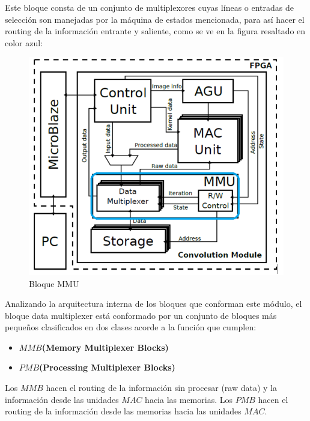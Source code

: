 Este bloque consta de un conjunto de multiplexores cuyas líneas o entradas de selección son manejadas por la máquina de estados mencionada, para así hacer el routing de la información entrante y saliente, como se ve en la figura resaltado en color azul:
\begin{figure}
\centering
\includegraphics[scale=0.8]{arq_blue.png}
\caption{Bloque MMU}
\label{mmu_location}
\end{figure}

\bigskip
Analizando la arquitectura interna de los bloques que conforman este módulo, el bloque data multiplexer está conformado por un conjunto de bloques más pequeños clasificados en dos clases acorde a la función que cumplen:
\begin{frame}{}
\begin{itemize}

 \item \textbf{$MMB$(Memory Multiplexer Blocks)}
  \item \textbf{$PMB$(Processing Multiplexer Blocks)}

\end{itemize}
\end{frame}


Los $MMB$ hacen el routing de la información sin procesar (raw data) y la información desde las unidades $MAC$ hacia las memorias.
Los $PMB$ hacen el routing de la información desde las memorias hacia las unidades $MAC$.\\
\bigskip

